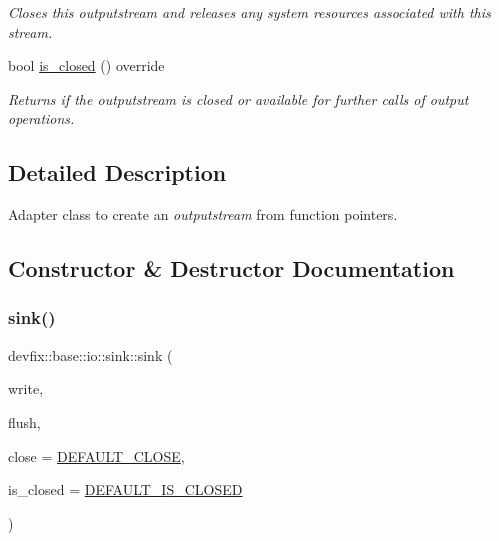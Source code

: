 \begin{DoxyCompactItemize}
\begin{DoxyCompactList}\small\item\em Closes this {\itshape outputstream} and releases any system resources associated with this stream. \end{DoxyCompactList}\item 
bool \hyperlink{structdevfix_1_1base_1_1io_1_1sink_a7d006bfd462ad29884aef9f6a7f40006}{is\+\_\+closed} () override
\begin{DoxyCompactList}\small\item\em Returns if the {\itshape outputstream} is closed or available for further calls of output operations. \end{DoxyCompactList}\end{DoxyCompactItemize}


\subsection{Detailed Description}
Adapter class to create an {\itshape outputstream} from function pointers. 

\subsection{Constructor \& Destructor Documentation}
\mbox{\label{structdevfix_1_1base_1_1io_1_1sink_a5e065482904521fde4ac8d0e378529c8}} 
\subsubsection{\texorpdfstring{sink()}{sink()}}
{\footnotesize\ttfamily devfix\+::base\+::io\+::sink\+::sink (\begin{DoxyParamCaption}\item[{\hyperlink{namespacedevfix_1_1base_1_1io_aaa3124cddb420001b0296561c60f8fcd}{write\+\_\+t}}]{write,  }\item[{\hyperlink{namespacedevfix_1_1base_1_1io_a622685976c7f503411827fba028d3ce1}{flush\+\_\+t}}]{flush,  }\item[{\hyperlink{namespacedevfix_1_1base_1_1io_ae3118387742e5f4d484a328a213d6a5d}{close\+\_\+t}}]{close = {\ttfamily \hyperlink{namespacedevfix_1_1base_1_1io_a14a286c17d4b93881d42b1d14beb2d0b}{D\+E\+F\+A\+U\+L\+T\+\_\+\+C\+L\+O\+SE}},  }\item[{\hyperlink{namespacedevfix_1_1base_1_1io_a14f89d4437ced6ede49c044ee8e71f17}{is\+\_\+closed\+\_\+t}}]{is\+\_\+closed = {\ttfamily \hyperlink{namespacedevfix_1_1base_1_1io_ae04fec2a2a2db3482e624a59e59a2a14}{D\+E\+F\+A\+U\+L\+T\+\_\+\+I\+S\+\_\+\+C\+L\+O\+S\+ED}} }\end{DoxyParamCaption})}



